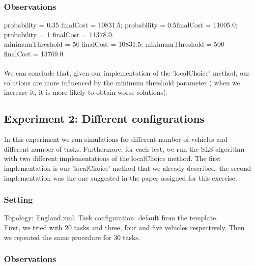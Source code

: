 \documentclass[11pt]{article}
\begin{document}
\subsubsection{Observations}
probability = 0.35 \textrightarrow finalCost = 10831.5; probability = 0.5\textrightarrow finalCost = 11005.0;   probability = 1 \textrightarrow finalCost = 11378.0.
\\
minimumThreshold = 50 \textrightarrow finalCost = 10831.5; minimumThreshold = 500 \textrightarrow finalCost = 13769.0
\\
\\
We can conclude that, given our implementation of the 'localChoice' method, our solutions are more influenced by the minimum threshold parameter ( when we increase it, it is more likely to obtain worse solutions).

\subsection{Experiment 2: Different configurations}
In this experiment we run simulations for different number of vehicles and different number of tasks. Furthermore, for each test, we run the SLS algorithm with two different implementations of the localChoice method. The first implementation is our 'localChoice' method that we already described, the second implementation was the one suggested in the paper assigned for this exercise.
\subsubsection{Setting}
Topology: England.xml; Task configuration: default from the template.
\\
First, we tried with 20 tasks and three, four and five vehicles respectively. Then we repeated the same procedure for 30 tasks.

\subsubsection{Observations}
\end{document}
